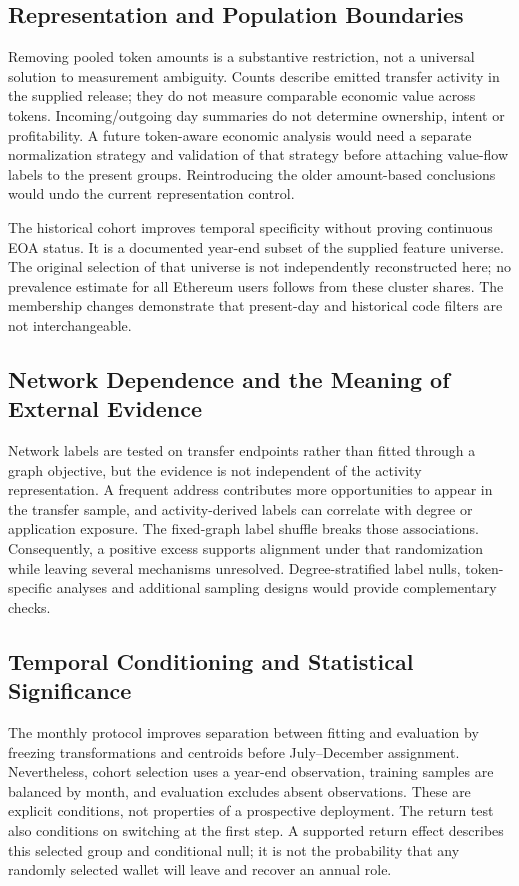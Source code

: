 \subsection{Representation and Population Boundaries}
Removing pooled token amounts is a substantive restriction, not a universal solution to measurement ambiguity. Counts describe emitted transfer activity in the supplied release; they do not measure comparable economic value across tokens. Incoming/outgoing day summaries do not determine ownership, intent or profitability. A future token-aware economic analysis would need a separate normalization strategy and validation of that strategy before attaching value-flow labels to the present groups. Reintroducing the older amount-based conclusions would undo the current representation control.

The historical cohort improves temporal specificity without proving continuous EOA status. It is a documented year-end subset of the supplied feature universe. The original selection of that universe is not independently reconstructed here; no prevalence estimate for all Ethereum users follows from these cluster shares. The membership changes demonstrate that present-day and historical code filters are not interchangeable.

\subsection{Network Dependence and the Meaning of External Evidence}
Network labels are tested on transfer endpoints rather than fitted through a graph objective, but the evidence is not independent of the activity representation. A frequent address contributes more opportunities to appear in the transfer sample, and activity-derived labels can correlate with degree or application exposure. The fixed-graph label shuffle breaks those associations. Consequently, a positive excess supports alignment under that randomization while leaving several mechanisms unresolved. Degree-stratified label nulls, token-specific analyses and additional sampling designs would provide complementary checks.

\subsection{Temporal Conditioning and Statistical Significance}
The monthly protocol improves separation between fitting and evaluation by freezing transformations and centroids before July--December assignment. Nevertheless, cohort selection uses a year-end observation, training samples are balanced by month, and evaluation excludes absent observations. These are explicit conditions, not properties of a prospective deployment. The return test also conditions on switching at the first step. A supported return effect describes this selected group and conditional null; it is not the probability that any randomly selected wallet will leave and recover an annual role.

